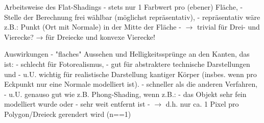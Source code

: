 \documentclass[10pt,landscape]{article}
\begin{document}
\begin{multicols}{3}
Arbeitsweise des Flat-Shadings
- stets nur 1 Farbwert pro (ebener) Fläche,
- Stelle der Berechnung frei wählbar (möglichst repräsentativ),
- repräsentativ wäre z.B.: Punkt (Ort mit Normale) in der Mitte der Fläche
- $\rightarrow$ trivial für Drei- und Vierecke? → für Dreiecke und konvexe Vierecke!

Auswirkungen
- "flaches" Aussehen und Helligkeitssprünge an den Kanten, das ist:
  - schlecht für Fotorealismus,
  - gut für abstraktere technische Darstellungen und
  - u.U. wichtig für realistische Darstellung kantiger Körper (insbes. wenn pro Eckpunkt nur eine Normale modelliert ist).
- schneller als die anderen Verfahren,
- u.U. genauso gut wie z.B. Phong-Shading, wenn z.B.:
  - das Objekt sehr fein modelliert wurde oder
  - sehr weit entfernt ist
- $\rightarrow$ d.h. nur ca. 1 Pixel pro Polygon/Dreieck gerendert wird (n==1)


\end{multicols}
\end{document}
